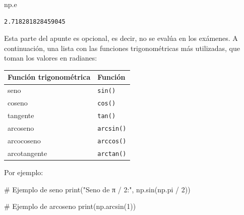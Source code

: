 \documentclass[
  letterpaper,
  DIV=11,
  numbers=noendperiod]{scrreprt}
\newenvironment{Shaded}{\begin{snugshade}}{\end{snugshade}}
\newcommand{\BuiltInTok}[1]{\textcolor[rgb]{0.00,0.23,0.31}{#1}}
\newcommand{\CommentTok}[1]{\textcolor[rgb]{0.37,0.37,0.37}{#1}}
\newcommand{\DecValTok}[1]{\textcolor[rgb]{0.68,0.00,0.00}{#1}}
\newcommand{\NormalTok}[1]{\textcolor[rgb]{0.00,0.23,0.31}{#1}}
\newcommand{\OperatorTok}[1]{\textcolor[rgb]{0.37,0.37,0.37}{#1}}
\newcommand{\StringTok}[1]{\textcolor[rgb]{0.13,0.47,0.30}{#1}}
\begin{document}
\begin{Shaded}
\begin{Highlighting}[]
\NormalTok{np.e}
\end{Highlighting}
\end{Shaded}

\begin{verbatim}
2.718281828459045
\end{verbatim}

\begin{tcolorbox}[enhanced jigsaw, arc=.35mm, toptitle=1mm, colframe=quarto-callout-note-color-frame, bottomtitle=1mm, opacitybacktitle=0.6, colbacktitle=quarto-callout-note-color!10!white, leftrule=.75mm, coltitle=black, toprule=.15mm, titlerule=0mm, title=\textcolor{quarto-callout-note-color}{\faInfo}\hspace{0.5em}{Funciones trigonométricas (opcional)}, bottomrule=.15mm, rightrule=.15mm, colback=white, breakable, opacityback=0, left=2mm]

Esta parte del apunte es opcional, es decir, no se evalúa en los
exámenes. A continuación, una lista con las funciones trigonométricas
más utilizadas, que toman los valores en radianes:

\begin{longtable}[]{@{}ll@{}}
\toprule\noalign{}
Función trigonométrica & Función \\
\midrule\noalign{}
\endhead
\bottomrule\noalign{}
\endlastfoot
seno & \texttt{sin()} \\
coseno & \texttt{cos()} \\
tangente & \texttt{tan()} \\
arcoseno & \texttt{arcsin()} \\
arcocoseno & \texttt{arccos()} \\
arcotangente & \texttt{arctan()} \\
\end{longtable}

Por ejemplo:

\begin{Shaded}
\begin{Highlighting}[]
\CommentTok{\# Ejemplo de seno}
\BuiltInTok{print}\NormalTok{(}\StringTok{"Seno de π / 2:"}\NormalTok{, np.sin(np.pi }\OperatorTok{/} \DecValTok{2}\NormalTok{))}

\CommentTok{\# Ejemplo de arcoseno}
\BuiltInTok{print}\NormalTok{(np.arcsin(}\DecValTok{1}\NormalTok{))}
\end{Highlighting}
\end{Shaded}


\end{tcolorbox}
\end{document}
